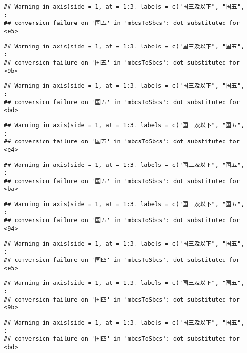 \documentclass[]{article}
\begin{document}
\begin{verbatim}
## Warning in axis(side = 1, at = 1:3, labels = c("国三及以下", "国五", :
## conversion failure on '国五' in 'mbcsToSbcs': dot substituted for <e5>
\end{verbatim}

\begin{verbatim}
## Warning in axis(side = 1, at = 1:3, labels = c("国三及以下", "国五", :
## conversion failure on '国五' in 'mbcsToSbcs': dot substituted for <9b>
\end{verbatim}

\begin{verbatim}
## Warning in axis(side = 1, at = 1:3, labels = c("国三及以下", "国五", :
## conversion failure on '国五' in 'mbcsToSbcs': dot substituted for <bd>
\end{verbatim}

\begin{verbatim}
## Warning in axis(side = 1, at = 1:3, labels = c("国三及以下", "国五", :
## conversion failure on '国五' in 'mbcsToSbcs': dot substituted for <e4>
\end{verbatim}

\begin{verbatim}
## Warning in axis(side = 1, at = 1:3, labels = c("国三及以下", "国五", :
## conversion failure on '国五' in 'mbcsToSbcs': dot substituted for <ba>
\end{verbatim}

\begin{verbatim}
## Warning in axis(side = 1, at = 1:3, labels = c("国三及以下", "国五", :
## conversion failure on '国五' in 'mbcsToSbcs': dot substituted for <94>
\end{verbatim}

\begin{verbatim}
## Warning in axis(side = 1, at = 1:3, labels = c("国三及以下", "国五", :
## conversion failure on '国四' in 'mbcsToSbcs': dot substituted for <e5>
\end{verbatim}

\begin{verbatim}
## Warning in axis(side = 1, at = 1:3, labels = c("国三及以下", "国五", :
## conversion failure on '国四' in 'mbcsToSbcs': dot substituted for <9b>
\end{verbatim}

\begin{verbatim}
## Warning in axis(side = 1, at = 1:3, labels = c("国三及以下", "国五", :
## conversion failure on '国四' in 'mbcsToSbcs': dot substituted for <bd>
\end{verbatim}
\end{document}
